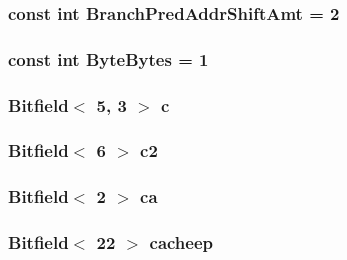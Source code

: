 \label{namespaceMipsISA_af89b5967055cc9764e7cd09e64a928a0}
\hypertarget{namespaceMipsISA_a518c446960e93d236b89246eabc20298}{
\subsubsection[{BranchPredAddrShiftAmt}]{\setlength{\rightskip}{0pt plus 5cm}const int {\bf BranchPredAddrShiftAmt} = 2}}
\label{namespaceMipsISA_a518c446960e93d236b89246eabc20298}
\hypertarget{namespaceMipsISA_a41548456e714690f506fe7d7b12a6c46}{
\subsubsection[{ByteBytes}]{\setlength{\rightskip}{0pt plus 5cm}const int {\bf ByteBytes} = 1}}
\label{namespaceMipsISA_a41548456e714690f506fe7d7b12a6c46}
\hypertarget{namespaceMipsISA_a9870e0f31b895bc27b12e0f5caf3be8e}{
\subsubsection[{c}]{\setlength{\rightskip}{0pt plus 5cm}Bitfield$<$ 5, 3 $>$ {\bf c}}}
\label{namespaceMipsISA_a9870e0f31b895bc27b12e0f5caf3be8e}
\hypertarget{namespaceMipsISA_af545a7d7c9648376a8762e362f9ca024}{
\subsubsection[{c2}]{\setlength{\rightskip}{0pt plus 5cm}Bitfield$<$ 6 $>$ {\bf c2}}}
\label{namespaceMipsISA_af545a7d7c9648376a8762e362f9ca024}
\hypertarget{namespaceMipsISA_ac82727b2bc87f74aec8c94902d28b6e7}{
\subsubsection[{ca}]{\setlength{\rightskip}{0pt plus 5cm}Bitfield$<$ 2 $>$ {\bf ca}}}
\label{namespaceMipsISA_ac82727b2bc87f74aec8c94902d28b6e7}
\hypertarget{namespaceMipsISA_a297386c6b4091f227ba72fe86f438239}{
\subsubsection[{cacheep}]{\setlength{\rightskip}{0pt plus 5cm}Bitfield$<$ 22 $>$ {\bf cacheep}}}
